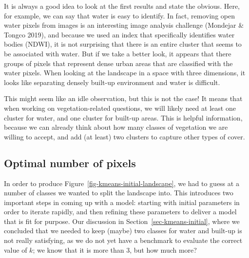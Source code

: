 \documentclass[
  letterpaper,
]{scrbook}
\begin{document}

It is always a good idea to look at the first results and state the
obvious. Here, for example, we can say that water is easy to identify.
In fact, removing open water pixels from images is an interesting image
analysis challenge (Mondejar \& Tongco 2019), and because we used an
index that specifically identifies water bodies (NDWI), it is not
surprising that there is an entire cluster that seems to be associated
with water. But if we take a better look, it appears that there groups
of pixels that represent dense urban areas that are classified with the
water pixels. When looking at the landscape in a space with three
dimensions, it looks like separating densely built-up environment and
water is difficult.

This might seem like an idle observation, but this is not the case! It
means that when working on vegetation-related questions, we will likely
need at least one cluster for water, and one cluster for built-up areas.
This is helpful information, because we can already think about how many
classes of vegetation we are willing to accept, and add (at least) two
clusters to capture other types of cover.

\subsection{Optimal number of pixels}\label{optimal-number-of-pixels}


In order to produce Figure~\ref{fig-kmeans-initial-landscape}, we had to
guess at a number of classes we wanted to split the landscape into. This
introduces two important steps in coming up with a model: starting with
initial parameters in order to iterate rapidly, and then refining these
parameters to deliver a model that is fit for purpose. Our discussion in
Section~\ref{sec-kmeans-initial}, where we concluded that we needed to
keep (maybe) two classes for water and built-up is not really
satisfying, as we do not yet have a benchmark to evaluate the correct
value of \(k\); we know that it is more than 3, but how much more?
\end{document}
